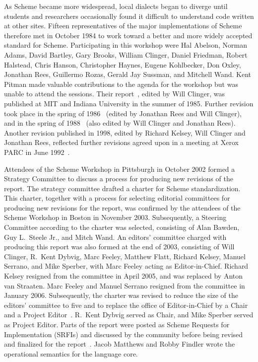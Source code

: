 \vest As Scheme became more widespread,
local dialects began to diverge until students and researchers
occasionally found it difficult to understand code written at other
sites.
Fifteen representatives of the major implementations of Scheme therefore
met in October 1984 to work toward a better and more widely accepted
standard for Scheme.
Participating in this workshop were Hal Abelson, Norman Adams, David
Bartley, Gary Brooks, William Clinger, Daniel Friedman, Robert Halstead,
Chris Hanson, Christopher Haynes, Eugene Kohlbecker, Don Oxley, Jonathan Rees,
Guillermo Rozas, Gerald Jay Sussman, and Mitchell Wand.  Kent Pitman
made valuable contributions to the agenda for the workshop but was
unable to attend the sessions.
%
Their report~\cite{RRRS}, edited by Will Clinger,
was published at MIT and Indiana University in the summer of 1985.
Further revision took place in the spring of 1986~\cite{R3RS} (edited
by Jonathan Rees and Will Clinger),
and in the spring of 1988~\cite{R4RS} (also edited by Will Clinger and
Jonathan Rees).  Another revision published in 1998, edited
by Richard Kelsey, Will Clinger and Jonathan Rees,
reflected further revisions agreed upon in a meeting at Xerox PARC in
June 1992~\cite{R5RS}.

Attendees of the Scheme Workshop in Pittsburgh in October 2002 formed
a Strategy Committee to discuss a process for producing new revisions
of the report.  The strategy committee drafted a charter for Scheme
standardization.  This charter, together with a process for selecting
editorial committees for producing new revisions for the report, was
confirmed by the attendees of the Scheme Workshop in Boston in
November 2003.  Subsequently, a Steering Committee according to the
charter was selected, consisting of Alan Bawden, Guy L.\ Steele Jr.,
and Mitch Wand.  An editors' committee charged with producing this report was
also formed at the end of 2003, consisting of Will Clinger,
R.\ Kent Dybvig, Marc Feeley, Matthew Flatt, Richard Kelsey, Manuel
Serrano, and Mike Sperber, with Marc Feeley acting as Editor-in-Chief.
Richard Kelsey resigned from the committee in April 2005, and was
replaced by Anton van Straaten.  
Marc Feeley and Manuel Serrano
resigned from the committee in January 2006.  Subsequently, the charter
was revised to reduce the size of the editors' committee to five and
to replace the office of Editor-in-Chief by a Chair and a Project
Editor~\cite{SchemeCharter2006}.  R.\ Kent Dybvig served as Chair, and
Mike Sperber served as Project Editor.
Parts of the report were posted as Scheme Requests for Implementation
(SRFIs) and discussed by the community before being revised and finalized for
the report~\cite{srfi75,srfi76,srfi77,srfi83,srfi93}.
Jacob Matthews and Robby
Findler wrote the operational semantics for the language core.

